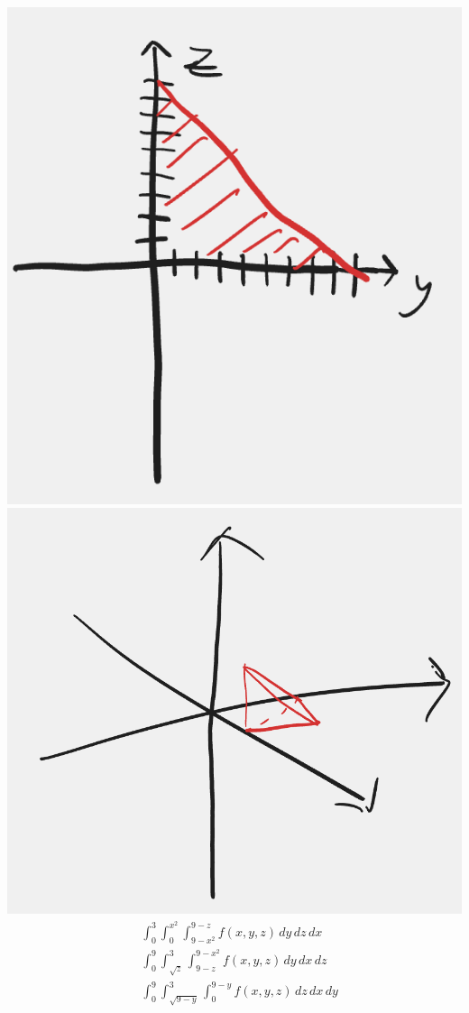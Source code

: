 \documentclass[12pt]{exam}
\begin{document}
\begin{questions}
\begin{solution}
{            \includegraphics*[scale=0.4]{images/07-yz.png}
            \includegraphics*[scale=0.5]{images/07-surface.png}
        }
        \begin{align}
            &\int_{0}^{3}\int_{0}^{x^2}\int_{9-x^2}^{9-z} f(x, y, z) \, dy\, dz\, dx \\
            &\int_{0}^{9}\int_{\sqrt{z}}^{3}\int_{9-z}^{9-x^2} f(x, y, z) \, dy\, dx\, dz \\
            &\int_{0}^{9}\int_{\sqrt{9-y}}^{3}\int_{0}^{9-y} f(x, y, z) \, dz\, dx\, dy
        \end{align}
    \end{solution}


\end{questions}
\end{document}
